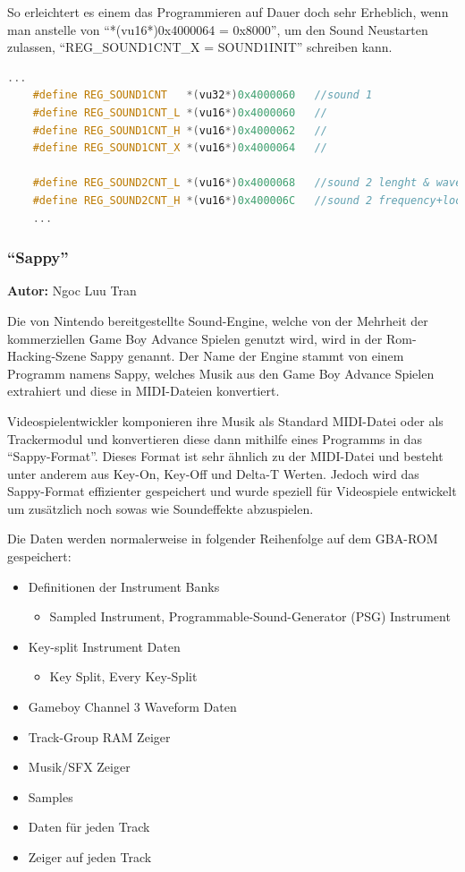 \documentclass[11pt,a4paper]{scrartcl}
\newcommand{\AutorNgoc} {
    \vspace{-4mm}
    \large \textbf{Autor:} Ngoc Luu Tran \normalsize
    \vspace{2mm}
}
\begin{document}
So erleichtert es einem das Programmieren auf Dauer doch sehr Erheblich, wenn man anstelle von "`*(vu16*)0x4000064 = 0x8000"', um den Sound Neustarten zulassen, "`REG\_SOUND1CNT\_X = SOUND1INIT"' schreiben kann.
\newpage
\vspace{5mm}
\begin{lstlisting}[language=C++, caption={2. Ausschnitt aus Belogic gba.h}, label={list:gbaheader1}]
    ...
	#define REG_SOUND1CNT   *(vu32*)0x4000060	//sound 1
	#define REG_SOUND1CNT_L *(vu16*)0x4000060	//
	#define REG_SOUND1CNT_H *(vu16*)0x4000062	//
	#define REG_SOUND1CNT_X *(vu16*)0x4000064	//

	#define REG_SOUND2CNT_L *(vu16*)0x4000068	//sound 2 lenght & wave duty
	#define REG_SOUND2CNT_H *(vu16*)0x400006C	//sound 2 frequency+loop+reset
	...
\end{lstlisting}


\subsubsection{\enquote{Sappy}}
\AutorNgoc

Die von Nintendo bereitgestellte Sound-Engine, welche von der Mehrheit der kommerziellen Game Boy Advance Spielen genutzt wird, wird in der Rom-Hacking-Szene Sappy genannt. 
Der Name der Engine stammt von einem Programm namens Sappy, welches Musik aus den Game Boy Advance Spielen extrahiert und diese in MIDI-Dateien konvertiert.


Videospielentwickler komponieren ihre Musik als Standard MIDI-Datei oder als Trackermodul und konvertieren diese dann mithilfe eines Programms in das \enquote{Sappy-Format}. Dieses Format ist sehr \"ahnlich zu der MIDI-Datei und besteht unter anderem aus Key-On, Key-Off und Delta-T Werten. Jedoch wird das Sappy-Format effizienter gespeichert und wurde speziell f\"ur Videospiele entwickelt um zus\"atzlich noch sowas wie Soundeffekte abzuspielen.

Die Daten werden normalerweise in folgender Reihenfolge auf dem GBA-ROM gespeichert:
\vspace{15pt}
\begin{itemize}
\item Definitionen der Instrument Banks
\begin{itemize}
\item Sampled Instrument, Programmable-Sound-Generator (PSG) Instrument
\end{itemize}
\item Key-split Instrument Daten
\begin{itemize}
\item Key Split, Every Key-Split
\end{itemize}
\item Gameboy Channel 3 Waveform Daten
\item Track-Group RAM Zeiger
\item Musik/SFX Zeiger
\item Samples
\item Daten f\"ur jeden Track
\item Zeiger auf jeden Track
\end{itemize}
\vspace{15pt}
\end{document}

